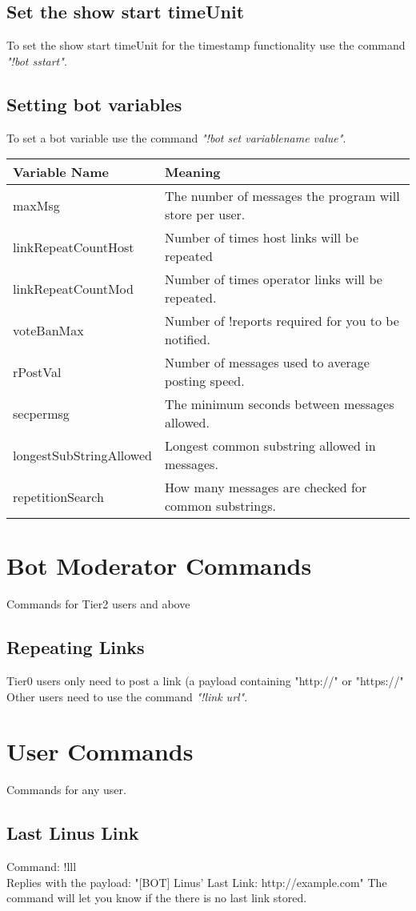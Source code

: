\documentclass[10pt]{article}
\begin{document}
\subsection{Set the show start timeUnit}
To set the show start timeUnit for the timestamp functionality use the command \emph{"!bot sstart"}.
\subsection{Setting bot variables}
To set a bot variable use the command \emph{"!bot set variablename value"}.\\
\begin{tabular}{| l | l |}
\hline
Variable Name & Meaning\\ \hline
maxMsg & The number of messages the program will store per user.\\ \hline
linkRepeatCountHost & Number of times host links will be repeated\\ \hline
linkRepeatCountMod & Number of times operator links will be repeated.\\ \hline
voteBanMax & Number of !reports required for you to be notified.\\ \hline
rPostVal & Number of messages used to average posting speed.\\ \hline
secpermsg & The minimum seconds between messages allowed.\\ \hline
longestSubStringAllowed & Longest common substring allowed in messages.\\ \hline
repetitionSearch & How many messages are checked for common substrings.\\ \hline
\end{tabular}
\section{Bot Moderator Commands}
Commands for Tier2 users and above
\subsection{Repeating Links}
Tier0 users only need to post a link (a payload containing "http://" or "https://"\\
Other users need to use the command \emph{"!link url"}.
\section{User Commands}
Commands for any user.
\subsection{Last Linus Link}
Command: !lll\\
Replies with the payload: "[BOT] Linus' Last Link: http://example.com"
The command will let you know if the there is no last link stored.
\end{document}
